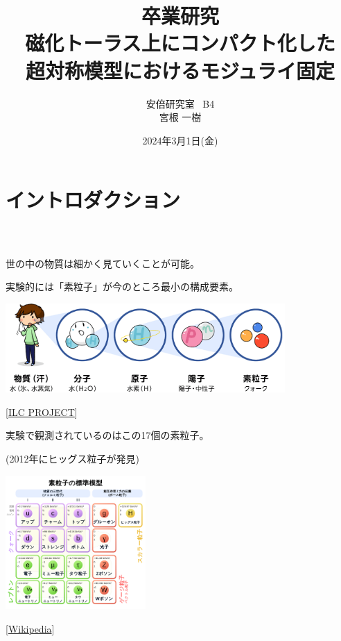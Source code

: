 \documentclass[
  unicode,a4paper,11pt,aspectratio=169,
  xcolor = {dvipsnames,svgnames},
  hyperref ={colorlinks=true,citecolor=Navy,linkcolor=NavyBlue,urlcolor=purple},
  ja=standard,lualatex
]{beamer}
\title{
  卒業研究
  \texorpdfstring{\\}{}
  \texorpdfstring{\vspace*{5pt}}{}
  {\LARGE
    磁化トーラス上にコンパクト化した
    \\
    超対称模型におけるモジュライ固定
  }
}
\author{
  安倍研究室 \ B4
  \texorpdfstring{\\}{}
  \texorpdfstring{\vspace*{3pt}}{}
  宮根 一樹
}
\date{2024年3月1日(金)}
\begin{document}
\begin{frame}
  \titlepage
\end{frame}


\section{イントロダクション}

\begin{frame}[plain]
  \frametitle{\ }
  \huge \secname
\end{frame}

\begin{frame}
  世の中の物質は細かく見ていくことが可能。

  実験的には「素粒子」が今のところ最小の構成要素。

  \begin{center}
    \includegraphics[width=0.8\textwidth]{fig/ILCproject.png}       

    \vspace*{-5pt}
    { \small
      \hspace*{6cm}
      [\href{https://aaa-sentan.org/ILC/about_physics/anatomy01.html}{ILC PROJECT}]
    }   
  \end{center}

\end{frame}

\begin{frame}
  
  \begin{center}

    実験で観測されているのはこの17個の素粒子。
  
    (2012年にヒッグス粒子が発見)

    \includegraphics[width=0.4\textwidth]{fig/SM.png}  

    \vspace*{-15pt}
    { \small
      \hspace*{4cm}
      [\href{https://ja.wikipedia.org/wiki/標準模型}{Wikipedia}]
    }
  \end{center}

\end{frame}
\end{document}
